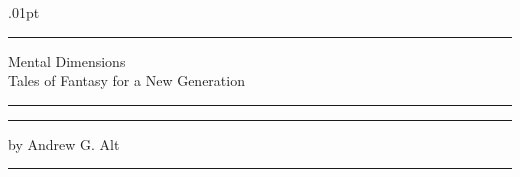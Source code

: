 \thispagestyle{empty}
\topskip.01pt
\vspace*{\fill}
\begin{center}
	\noindent\rule{\textwidth}{2pt}
	\vspace{10pt}
	{\Huge Mental Dimensions} \\
	\vspace{.5em}
	{\large Tales of Fantasy for a New Generation} \\
	\vspace{.5em}
	\noindent\rule{\textwidth}{2pt}

	\vspace{5.5in}

	\rule{\textwidth}{2pt}
	\vspace{.5em}
	{\large by Andrew G. Alt}
	\rule{\textwidth}{2pt}
\end{center}
\vspace*{\fill}
